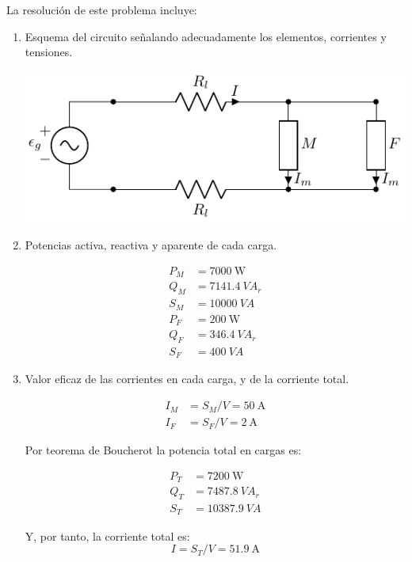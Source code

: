 \documentclass[12pt]{article}
\begin{document}
La resolución de este problema incluye: 
\begin{enumerate}
\item Esquema del circuito señalando adecuadamente los elementos,
  corrientes y tensiones.

    
  \begin{center}
    \includegraphics{../figs/circuito_cargas.pdf}
  \end{center}
  
\item Potencias activa, reactiva y aparente de cada carga.

\begin{align*}
  P_M &= \SI{7000}{\watt}\\
  Q_M &= \SI{7141.4}{VA}_r\\
  S_M &= \SI{10000}{VA}\\
  P_F &= \SI{200}{\watt}\\
  Q_F &= \SI{346.4}{VA}_r\\
  S_F &= \SI{400}{VA}
\end{align*}

\item Valor eficaz de las corrientes en cada carga, y de la corriente
  total.

  \begin{align*}
    I_M &= S_M / V = \SI{50}{\ampere}\\
    I_F &= S_F / V = \SI{2}{\ampere}
  \end{align*}

  Por teorema de Boucherot la potencia total en cargas es:

\begin{align*}
  P_T &= \SI{7200}{\watt}\\
  Q_T &= \SI{7487.8}{VA}_r\\
  S_T &= \SI{10387.9}{VA}
\end{align*}

Y, por tanto, la corriente total es:
\[
  I = S_T / V = \SI{51.9}{\ampere}
\]


\end{enumerate}
\end{document}
